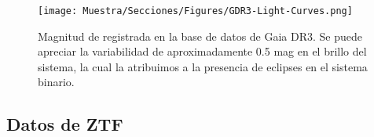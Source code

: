\begin{figure}[!ht]
	\centering
	\texttt{[image: Muestra/Secciones/Figures/GDR3-Light-Curves.png]}

	\caption{Magnitud de \atoObjId registrada en la base de datos de Gaia DR3.
	Se puede apreciar la variabilidad de aproximadamente 0.5 mag en el brillo
	del sistema, la cual la atribuimos a la presencia de eclipses en el sistema
	binario. \citet{gdr3ReleaseDocumentation}}
	\label{gdr3AtoObjLightCurves}
\end{figure}

\subsection{Datos de ZTF}